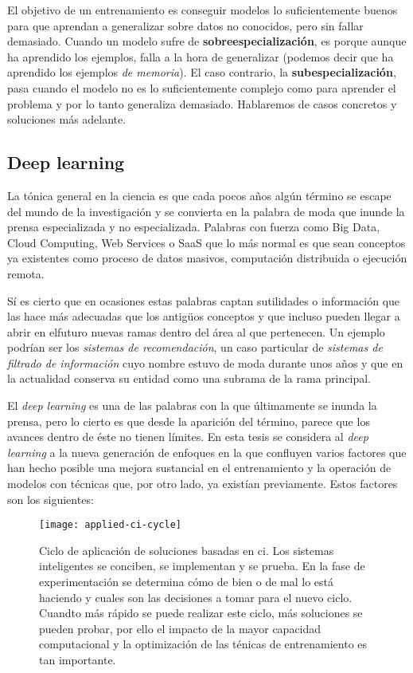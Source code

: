 El objetivo de un entrenamiento es conseguir modelos lo suficientemente buenos para que aprendan a generalizar sobre datos no conocidos, pero sin fallar demasiado. Cuando un modelo sufre de \textbf{sobreespecialización}, es porque aunque ha aprendido los ejemplos, falla a la hora de generalizar (podemos decir que ha aprendido los ejemplos \textit{de memoria}). El caso contrario, la \textbf{subespecialización}, pasa cuando el modelo no es lo suficientemente complejo como para aprender el problema y por lo tanto generaliza demasiado. Hablaremos de casos concretos y soluciones más adelante.

\subsection{Deep learning}
\label{ss:deep-learning}

La tónica general en la ciencia es que cada pocos años algún término se escape del mundo de la investigación y se convierta en la palabra de moda que inunde la prensa especializada y no especializada. Palabras con fuerza como Big Data, Cloud Computing, Web Services o SaaS que lo más normal es que sean conceptos ya existentes como proceso de datos masivos, computación distribuida o ejecución remota.

Sí es cierto que en ocasiones estas palabras captan sutilidades o información que las hace más adecuadas que los antigüos conceptos y que incluso pueden llegar a abrir en elfuturo nuevas ramas dentro del área al que pertenecen. Un ejemplo podrían ser los \textit{sistemas de recomendación}, un caso particular de \textit{sistemas de filtrado de información} cuyo nombre estuvo de moda durante unos años y que en la actualidad conserva su entidad como una subrama de la rama principal.

El \textit{deep learning} es una de las palabras con la que últimamente se inunda la prensa, pero lo cierto es que desde la aparición del término, parece que los avances dentro de éste no tienen límites. En esta tesis se considera al \textit{deep learning} a la nueva generación de enfoques en la que confluyen varios factores que han hecho posible una mejora sustancial en el entrenamiento y la operación de modelos con técnicas que, por otro lado, ya existían previamente. Estos factores son los siguientes:

\begin{figure}[t]
	\centering
	\texttt{[image: applied-ci-cycle]}
	\caption[Ciclo de aplicación de soluciones basadas en \acrlong{ci}]{Ciclo de aplicación de soluciones basadas en \acrlong{ci}. Los sistemas inteligentes se conciben, se implementan y se prueba. En la fase de experimentación se determina cómo de bien o de mal lo está haciendo y cuales son las decisiones a tomar para el nuevo ciclo. Cuandto más rápido se puede realizar este ciclo, más soluciones se pueden probar, por ello el impacto de la mayor capacidad computacional y la optimización de las ténicas de entrenamiento es tan importante.}
	\label{fig:applied-ci-cycle}
\end{figure}

